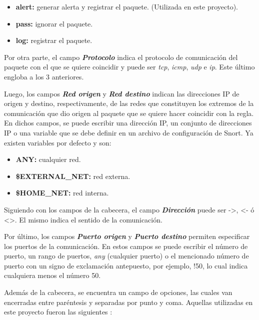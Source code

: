 \begin{itemize}
\item{\textbf{alert:}} generar alerta y registrar el paquete. (Utilizada en este proyecto).
\item{\textbf{pass:}} ignorar el paquete.
\item{\textbf{log:}} registrar el paquete.
\end{itemize}

Por otra parte, el campo \textbf{\textit{Protocolo}} indica el protocolo de comunicación del paquete con el que se quiere coincidir y puede ser \textit{tcp}, \textit{icmp}, \textit{udp} e \textit{ip}. Este último engloba a los 3 anteriores.

Luego, los campos \textbf{\textit{Red origen}} y \textbf{\textit{Red destino}} indican las direcciones IP de origen y destino, respectivamente, de las redes que constituyen los extremos de la comunicación que dio origen al paquete que se quiere hacer coincidir con la regla. En dichos campos, se puede escribir una dirección IP, un conjunto de direcciones IP o una variable que se debe definir en un archivo de configuración de Snort. Ya existen variables por defecto y son:

\begin{itemize}
\item {\textbf{ANY:}} cualquier red.
\item {\textbf{\$EXTERNAL\_NET:}} red externa.
\item {\textbf{\$HOME\_NET:}} red interna.
\end{itemize}

Siguiendo con los campos de la cabecera, el campo \textbf{\textit{Dirección}} puede ser ->, <- ó <>. El mismo indica el sentido de la comunicación.

Por último, los campos \textbf{\textit{Puerto origen}} y \textbf{\textit{Puerto destino}} permiten especificar los puertos de la comunicación. En estos campos se puede escribir el número de puerto, un rango de puertos, \textit{any} (cualquier puerto) o el mencionado número de puerto con un signo de exclamación antepuesto, por ejemplo, !50, lo cual indica cualquiera menos el número 50.	

Además de la cabecera, se encuentra un campo de opciones, las cuales van encerradas entre paréntesis y separadas por punto y coma. Aquellas utilizadas en este proyecto fueron las siguientes \parencite{snort_manual}:

